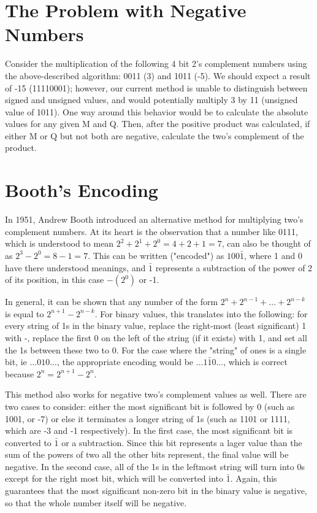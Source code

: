 \documentclass{article}
\begin{document}
\section{The Problem with Negative Numbers}
Consider the multiplication of the following 4 bit 2's complement numbers using the above-described algorithm: 0011 (3) and 1011 (-5).
We should expect a result of -15 (11110001); however, our current method is unable to distinguish between signed and unsigned values, and would potentially multiply 3 by 11 (unsigned value of 1011).
One way around this behavior would be to calculate the absolute values for any given M and Q.
Then, after the positive product was calculated, if either M or Q but not both are negative, calculate the two's complement of the product.

\section{Booth's Encoding}
In 1951, Andrew Booth introduced an alternative method for multiplying two's complement numbers.
At its heart is the observation that a number like 0111, which is understood to mean $2^2 + 2^1 + 2^0 = 4 + 2 + 1 = 7$, can also be thought of as $2^3 - 2^0 = 8 - 1 = 7$.
This can be written ("encoded") as $100\bar{1}$, where 1 and 0 have there understood meanings, and $\bar{1}$ represents a subtraction of the power of 2 of its position, in this case $-(2^0)$ or -1.

    In general, it can be shown that any number of the form $2^n + 2^{n-1} + ...
+ 2^{n-k}$ is equal to $2^{n+1} - 2^{n-k}$.
For binary values, this translates into the following: for every string of 1s in the binary value, replace the right-most (least significant) 1 with -, replace the first 0 on the left of the string (if it exists) with 1, and set all the 1s between these two to 0.
For the case where the "string" of ones is a single bit, ie $...010...$,
the appropriate encoding would be $...1\bar{1}0...$,
which is correct because $2^n = 2^{n+1} - 2^n$.

This method also works for negative two's complement values as well.
There are two cases to consider: either the most significant bit is followed by 0 (such as 1001, or -7) or else it terminates a longer string of 1s (such as 1101 or 1111, which are -3 and -1 respectively).
In the first case, the most significant bit is converted to $\bar{1}$ or a subtraction.
Since this bit represents a lager value than the sum of the powers of two all the other bits represent, the final value will be negative.
In the second case, all of the 1s in the leftmost string will turn into 0s except for the right most bit, which will be converted into $\bar{1}$.
Again, this guarantees that the most significant non-zero bit in the binary value is negative, so that the whole number itself will be negative.
\end{document}
